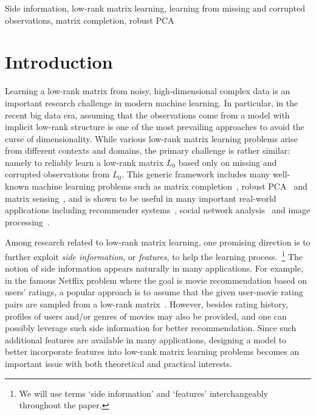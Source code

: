 \documentclass[twoside,11pt]{article}
\def\realL{L_0}
\begin{document}
\begin{keywords}
  Side information, low-rank matrix learning, learning from missing and corrupted observations, matrix completion, robust PCA
\end{keywords}

\section{Introduction}
\label{sec:intro}
Learning a low-rank matrix from noisy, high-dimensional complex data is an
important research challenge in modern machine learning.
In particular, in the recent big data era, assuming that the observations come
from a model with implicit low-rank structure
is one of the most prevailing approaches to avoid the curse of dimensionality.
While various low-rank matrix learning problems arise from different contexts and domains,
the primary challenge is rather similar: namely to
reliably learn a low-rank matrix $\realL$
based only on missing and corrupted observations from $\realL$.
This generic framework includes many well-known machine learning problems such as
matrix completion~\citep{Candes09a},
robust PCA~\citep{Wright09a} and matrix sensing~\citep{Zhong15a}, and is shown to be
useful in many important real-world applications including
recommender systems~\citep{Koren09a}, social network analysis~\citep{Hsieh12a}
and image processing~\citep{Wright09a}.

Among research related to low-rank matrix learning,
one promising direction %
is to further exploit {\it side information}, or {\it features},
to help the learning process.~\footnote{We will use terms `side information' and `features'
interchangeably throughout the paper.}
The notion of side information appears naturally in many applications.
For example, in the famous Netflix problem where the goal is movie
recommendation based on users' ratings, a popular
approach is to assume that the given user-movie rating pairs are sampled from a
low-rank matrix~\citep{Koren09a}.  However,
besides rating history, profiles of users and/or genres of movies may also be provided,
and one can possibly leverage such side information for better recommendation.
Since such additional features
are available in many applications,
designing a model to better incorporate features into low-rank matrix learning problems
becomes an important issue with both theoretical and practical interests.
\end{document}
